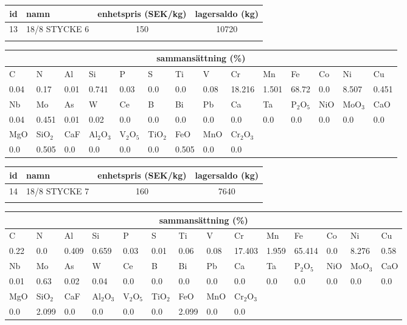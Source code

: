 \begin{center}
{\scriptsize\addtolength{\tabcolsep}{-3pt}
\begin{tabular}{clcc}
id&namn&enhetspris (SEK/kg)&lagersaldo (kg)\\
\hline
13&18/8 STYCKE 6&150&10720\\\\
\end{tabular}
\begin{tabular}{llllllllllllll}
\multicolumn{14}{c}{sammansättning (\%)}\\
\hline
C&N&Al&Si&P&S&Ti&V&Cr&Mn&Fe&Co&Ni&Cu\\
\hline
0.04&0.17&0.01&0.741& 0.03&0.0&0.0&0.08& 18.216&1.501&68.72&0.0& 8.507&0.451\\
\hline
Nb&Mo&As&W&Ce&B&Bi&Pb&Ca&Ta&P$_2$O$_5$&NiO&MoO$_3$&CaO\\
\hline
0.04& 0.451& 0.01& 0.02& 0.0& 0.0& 0.0& 0.0& 0.0& 0.0& 0.0& 0.0& 0.0& 0.0\\
\hline
MgO&SiO$_2$&CaF&Al$_2$O$_3$&V$_2$O$_5$&TiO$_2$&FeO&MnO&Cr$_2$O$_3$\\
\hline
0.0& 0.505& 0.0& 0.0& 0.0& 0.0& 0.505& 0.0& 0.0\\
\end{tabular}
}
\end{center}

\begin{center}
{\scriptsize\addtolength{\tabcolsep}{-3pt}
\begin{tabular}{clcc}
id&namn&enhetspris (SEK/kg)&lagersaldo (kg)\\
\hline
14&18/8 STYCKE 7&160&7640\\\\
\end{tabular}
\begin{tabular}{llllllllllllll}
\multicolumn{14}{c}{sammansättning (\%)}\\
\hline
C&N&Al&Si&P&S&Ti&V&Cr&Mn&Fe&Co&Ni&Cu\\
\hline
0.22&0.0&0.409&0.659& 0.03&0.01&0.06&0.08& 17.403&1.959&65.414&0.0& 8.276&0.58\\
\hline
Nb&Mo&As&W&Ce&B&Bi&Pb&Ca&Ta&P$_2$O$_5$&NiO&MoO$_3$&CaO\\
\hline
0.01& 0.63& 0.02& 0.04& 0.0& 0.0& 0.0& 0.0& 0.0& 0.0& 0.0& 0.0& 0.0& 0.0\\
\hline
MgO&SiO$_2$&CaF&Al$_2$O$_3$&V$_2$O$_5$&TiO$_2$&FeO&MnO&Cr$_2$O$_3$\\
\hline
0.0& 2.099& 0.0& 0.0& 0.0& 0.0& 2.099& 0.0& 0.0\\
\end{tabular}
}
\end{center}

